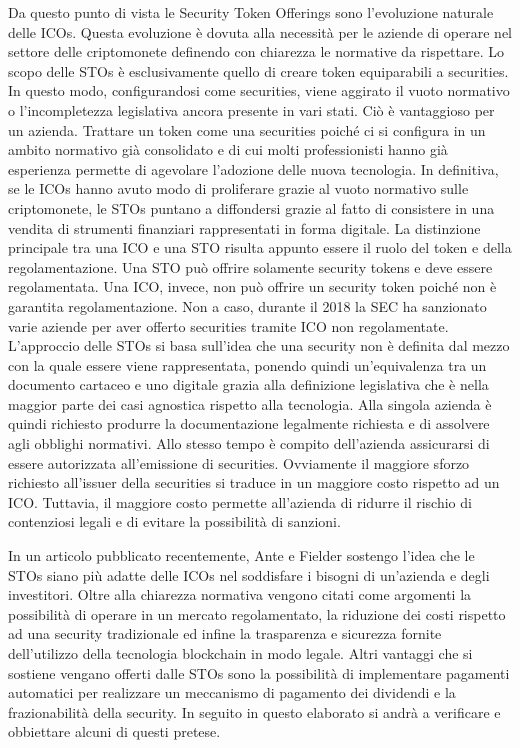 Da questo punto di vista le Security Token Offerings sono l'evoluzione naturale delle ICOs. Questa evoluzione è dovuta alla necessità per le aziende di operare nel settore delle criptomonete definendo con chiarezza le normative da rispettare. Lo scopo delle STOs è esclusivamente quello di creare token equiparabili a securities. In questo modo, configurandosi come securities, viene aggirato il vuoto normativo o l'incompletezza legislativa ancora presente in vari stati. Ciò è vantaggioso per un azienda. Trattare un token come una securities poiché ci si configura in un ambito normativo già consolidato e di cui molti professionisti hanno già esperienza permette di agevolare l'adozione delle nuova tecnologia. In definitiva, se le ICOs hanno avuto modo di proliferare grazie al vuoto normativo sulle criptomonete, le STOs puntano a diffondersi grazie al fatto di consistere in una vendita di strumenti finanziari rappresentati in forma digitale. La distinzione principale tra una ICO e una STO risulta appunto essere il ruolo del token e della regolamentazione. Una STO può offrire solamente security tokens e deve essere regolamentata. Una ICO, invece, non può offrire un security token poiché non è garantita regolamentazione. Non a caso, durante il 2018 la SEC ha sanzionato varie aziende per aver offerto securities tramite ICO non regolamentate. 
L'approccio delle STOs si basa sull'idea che una security non è definita dal mezzo con la quale essere viene rappresentata, ponendo quindi un'equivalenza tra un documento cartaceo e uno digitale grazia alla definizione legislativa che è nella maggior parte dei casi agnostica rispetto alla tecnologia. 
Alla singola azienda è quindi richiesto produrre la documentazione legalmente richiesta e di assolvere agli obblighi normativi. Allo stesso tempo è compito dell'azienda assicurarsi di essere autorizzata all'emissione di securities. Ovviamente il maggiore sforzo richiesto all'issuer della securities si traduce in un maggiore costo rispetto ad un ICO. Tuttavia, il maggiore costo permette all'azienda di ridurre il rischio di contenziosi legali e di evitare la possibilità di sanzioni. 

In un articolo pubblicato recentemente, Ante e Fielder\cite{K35} sostengo l'idea che le STOs siano più adatte delle ICOs nel soddisfare i bisogni di un'azienda e degli investitori. Oltre alla chiarezza normativa vengono citati come argomenti la possibilità di operare in un mercato regolamentato, la riduzione dei costi rispetto ad una security tradizionale ed infine la trasparenza e sicurezza fornite dell'utilizzo della tecnologia blockchain in modo legale.\cite{K30} Altri vantaggi che si sostiene vengano offerti dalle STOs sono la possibilità di implementare pagamenti automatici per realizzare un meccanismo di pagamento dei dividendi e la  frazionabilità della security\cite{K36}. In seguito in questo elaborato si andrà a verificare e obbiettare alcuni di questi pretese.  

